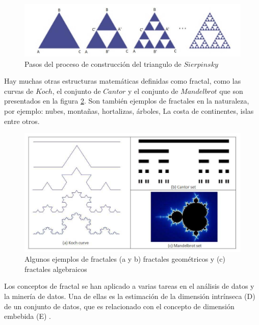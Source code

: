 \begin{figure}[h]
\centering
\includegraphics[scale=0.75]{chapter4/ima1.png}
\caption{Pasos del proceso de construcción del triangulo de $Sierpinsky$}
\label{fig:ima1}
\end{figure}
Hay muchas otras estructuras matemáticas definidas como fractal, como las curvas de   $Koch$,  el conjunto de $Cantor$ y el conjunto de $Mandelbrot$ que son presentados en la figura \ref{fig:ima2}. Son también ejemplos de fractales en la naturaleza, por ejemplo: nubes, montañas, hortalizas, árboles, La costa de continentes, islas entre otros.
\begin{figure}[h]
\centering
\includegraphics[scale=1.2]{chapter4/ima2.png}
\caption{Algunos ejemplos de fractales (a y b) fractales geométricos y (c) fractales algebraicos}
\label{fig:ima2}
\end{figure}


Los conceptos de fractal se han aplicado a varias tareas en el análisis de datos y la minería de datos. Una de ellas es la estimación de la dimensión intrínseca (D) de un conjunto de datos, que es relacionado  con el concepto de dimensión embebida (E) \cite{conf/pods/FaloutsosK94}.

